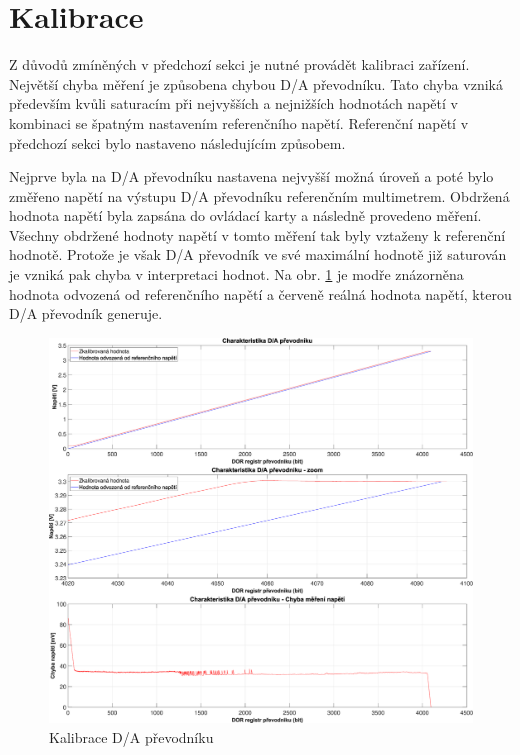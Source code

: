 \clearpage
\section{Kalibrace}
Z důvodů zmíněných v předchozí sekci je nutné provádět kalibraci zařízení. Největší chyba měření je způsobena
chybou D/A převodníku. Tato chyba vzniká především kvůli saturacím při nejvyšších a nejnižších hodnotách napětí
v kombinaci se špatným nastavením referenčního napětí. Referenční napětí v předchozí sekci bylo nastaveno
následujícím způsobem.\par
Nejprve byla na D/A převodníku nastavena nejvyšší možná úroveň a poté bylo změřeno napětí na výstupu D/A převodníku
referenčním multimetrem. Obdržená hodnota napětí byla zapsána do ovládací karty a následně provedeno měření.
Všechny obdržené hodnoty napětí v tomto měření tak byly vztaženy k referenční hodnotě. Protože je však D/A převodník
ve své maximální hodnotě již saturován je vzniká pak chyba v interpretaci hodnot. Na obr. \ref{fig: 10hourTest calib DAC}
je modře znázorněna hodnota odvozená od referenčního napětí a červeně reálná hodnota napětí, kterou D/A převodník generuje.\par

\begin{figure}[ht!]
    \centering
    \includegraphics[width = 1\textwidth]{obrazky/matlab_generated/VOLTAGE_TESTER/calib_DAC.eps}
    \caption{Kalibrace D/A převodníku}
    \label{fig: 10hourTest calib DAC}
\end{figure}


